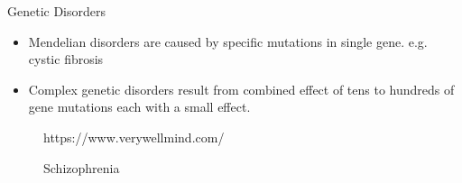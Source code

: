 \documentclass{beamer}
\begin{document}
\begin{frame}{Genetic Disorders}
\begin{itemize}
    \item Mendelian disorders are caused by specific mutations in single gene. e.g. cystic fibrosis
    \item Complex genetic disorders result from combined effect of tens to hundreds of gene mutations each with a small effect. 
\end{itemize}

\begin{figure}[h]	\noindent{}
    \caption{Schizophrenia}
    \label{fig:Schizophrenia}
        {\tiny https://www.verywellmind.com/}
\end{figure}
\end{frame}
\end{document}
